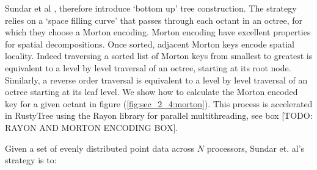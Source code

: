 Sundar et al \cite{sundar2008bottom}, therefore introduce `bottom up' tree construction. The strategy relies on a `space filling curve' that passes through each octant in an octree, for which they choose a Morton encoding. Morton encoding have excellent properties for spatial decompositions. Once sorted, adjacent Morton keys encode spatial locality. Indeed traversing a sorted list of Morton keys from smallest to greatest is equivalent to a level by level traversal of an octree, starting at its root node. Similarly, a reverse order traversal is equivalent to a level by level traversal of an octree starting at its leaf level. We show how to calculate the Morton encoded key for a given octant in figure (\ref{fig:sec_2_4:morton}). This process is accelerated in RustyTree using the Rayon library for parallel multithreading, see box [TODO: RAYON AND MORTON ENCODING BOX].

Given a set of evenly distributed point data across $N$ processors, Sundar et. al's strategy is to:

